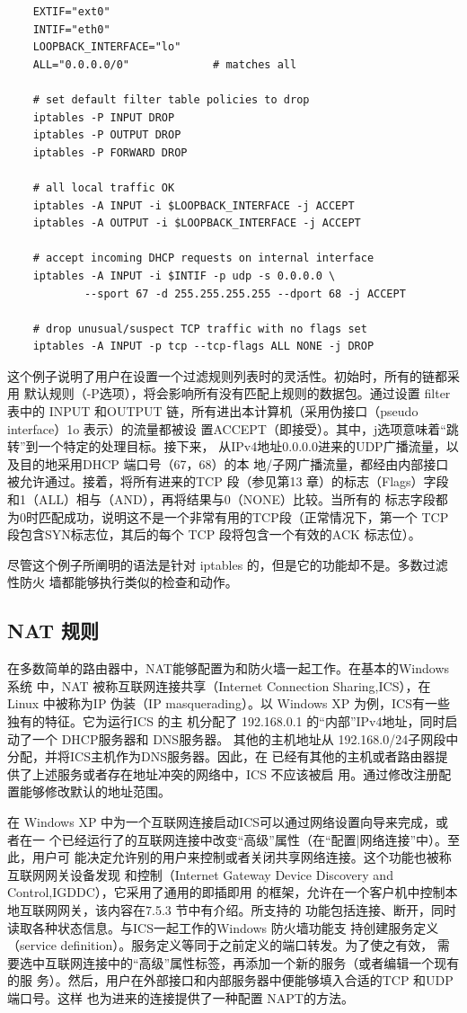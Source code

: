 \begin{verbatim}
	EXTIF="ext0"
	INTIF="eth0"
	LOOPBACK_INTERFACE="lo"
	ALL="0.0.0.0/0" 			# matches all

	# set default filter table policies to drop
	iptables -P INPUT DROP
	iptables -P OUTPUT DROP
	iptables -P FORWARD DROP

	# all local traffic OK
	iptables -A INPUT -i $LOOPBACK_INTERFACE -j ACCEPT
	iptables -A OUTPUT -i $LOOPBACK_INTERFACE -j ACCEPT

	# accept incoming DHCP requests on internal interface
	iptables -A INPUT -i $INTIF -p udp -s 0.0.0.0 \
			--sport 67 -d 255.255.255.255 --dport 68 -j ACCEPT

	# drop unusual/suspect TCP traffic with no flags set
	iptables -A INPUT -p tcp --tcp-flags ALL NONE -j DROP
\end{verbatim}

这个例子说明了用户在设置一个过滤规则列表时的灵活性。初始时，所有的链都采用
默认规则（-P选项），将会影响所有没有匹配上规则的数据包。通过设置 filter 表中的 INPUT
和OUTPUT 链，所有进出本计算机（采用伪接口（pseudo interface）1o 表示）的流量都被设
置ACCEPT（即接受）。其中，j选项意味着“跳转”到一个特定的处理目标。接下来，
从IPv4地址0.0.0.0进来的UDP广播流量，以及目的地采用DHCP 端口号（67，68）的本
地/子网广播流量，都经由内部接口被允许通过。接着，将所有进来的TCP 段（参见第13
章）的标志（Flags）字段和1（ALL）相与（AND），再将结果与0（NONE）比较。当所有的
标志字段都为0时匹配成功，说明这不是一个非常有用的TCP段（正常情况下，第一个 TCP
段包含SYN标志位，其后的每个 TCP 段将包含一个有效的ACK 标志位）。

尽管这个例子所阐明的语法是针对 iptables 的，但是它的功能却不是。多数过滤性防火
墙都能够执行类似的检查和动作。

\subsection{NAT 规则}

在多数简单的路由器中，NAT能够配置为和防火墙一起工作。在基本的Windows 系统
中，NAT 被称互联网连接共享（Internet Connection Sharing,ICS），在 Linux 中被称为IP
伪装（IP masquerading）。以 Windows XP 为例，ICS有一些独有的特征。它为运行ICS 的主
机分配了 192.168.0.1 的“内部”IPv4地址，同时启动了一个 DHCP服务器和 DNS服务器。
其他的主机地址从 192.168.0/24子网段中分配，并将ICS主机作为DNS服务器。因此，在
已经有其他的主机或者路由器提供了上述服务或者存在地址冲突的网络中，ICS 不应该被启
用。通过修改注册配置能够修改默认的地址范围。

在 Windows XP 中为一个互联网连接启动ICS可以通过网络设置向导来完成，或者在一
个已经运行了的互联网连接中改变“高级”属性（在“配置|网络连接”中）。至此，用户可
能决定允许别的用户来控制或者关闭共享网络连接。这个功能也被称互联网网关设备发现
和控制（Internet Gateway Device Discovery and Control,IGDDC），它采用了通用的即插即用
的框架，允许在一个客户机中控制本地互联网网关，该内容在7.5.3 节中有介绍。所支持的
功能包括连接、断开，同时读取各种状态信息。与ICS一起工作的Windows 防火墙功能支
持创建服务定义（service definition）。服务定义等同于之前定义的端口转发。为了使之有效，
需要选中互联网连接中的“高级”属性标签，再添加一个新的服务（或者编辑一个现有的服
务）。然后，用户在外部接口和内部服务器中便能够填入合适的TCP 和UDP端口号。这样
也为进来的连接提供了一种配置 NAPT的方法。


